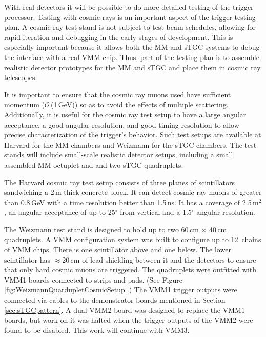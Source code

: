 

With real detectors it will be possible to do more detailed
testing of the trigger processor. Testing with cosmic rays is an
important aspect of the trigger testing
plan. A cosmic ray test stand is not subject to test beam schedules,
allowing for rapid iteration and debugging in the early stages of
development. This is especially important because it allows both the
MM and sTGC systems to debug the interface with a real VMM chip.
Thus, part of the testing plan is to assemble realistic detector
prototypes for the MM and sTGC and place them in
cosmic ray telescopes.

It is important to ensure that
the cosmic ray muons used have sufficient momentum ($\mathcal{O}$\,(1\,GeV)) so as
to avoid the effects of multiple scattering. Additionally, it is useful
for the cosmic ray test setup to have a large angular acceptance, a
good angular resolution, and good timing resolution to allow precise
characterization of the trigger's behavior. Such test setups are
available at Harvard for the MM chambers and Weizmann for the sTGC
chambers. The test stands will include small-scale realistic detector setups,
including a small assembled MM octuplet and and two sTGC quadruplets.

The Harvard cosmic ray test setup consists of three planes of
scintillators sandwiching a 2\,m thick concrete block. It can detect
cosmic ray muons of greater than 0.8\,GeV with a time resolution better
than 1.5\,ns.  It has a coverage of 2.5\,m$^2$, an angular acceptance
of up to 25$^{\circ}$ from vertical and a 1.5$^{\circ}$ angular resolution.

The Weizmann test stand is designed to hold up to two 60\,cm $\times$ 40\,cm quadruplets.
A VMM configuration system was built to configure up to 12~chains of VMM chips.
There is one scintillator above and one below.
The lower scintillator has $\approx$20\,cm of lead shielding between it and the detectors to ensure that only hard cosmic muons are triggered.
The quadruplets were outfitted with VMM1 boards connected to strips and pads. (See Figure\,\ref{fig:WeizmannQuardupletCosmicSetup}.)
The VMM1 trigger outputs were connected via cables to the demonstrator boards mentioned in Section\,\ref{sec:sTGCpattern}.
A dual-VMM2 board was designed to replace the VMM1 boards, but work on it was halted when the trigger outputs of the VMM2 were found to be disabled.
This work will continue with VMM3.


